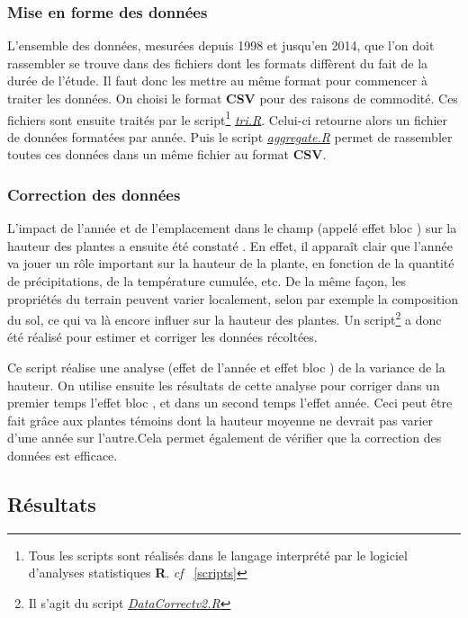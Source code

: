 \documentclass[12pt,a4paper]{article}
\begin{document}
			 			\subsubsection{Mise en forme des données}
			 				
			 				L'ensemble des données, mesurées depuis 1998 et jusqu'en 2014, que l'on doit rassembler se trouve dans des fichiers dont les formats diffèrent du fait de la durée de l'étude. Il faut donc les mettre au même format pour commencer à traiter les données. On choisi le format \textbf{CSV} pour des raisons de commodité. Ces fichiers sont ensuite traités par le script\footnote{Tous les scripts sont réalisés dans le langage interprété par le logiciel d'analyses statistiques \textbf{R}. \textit{cf} ~\ref{scripts}} \textit{\ul{tri.R}}. Celui-ci retourne alors un fichier de données formatées par année. Puis le script \textit{\ul{aggregate.R}} permet de rassembler toutes ces données dans un même fichier au format \textbf{CSV}.
			 			
			 			\subsubsection{Correction des données}
			 				
			 				L'impact de l'année et de l'emplacement dans le champ (appelé \og effet bloc \fg) sur la hauteur des plantes a ensuite été constaté . En effet, il apparaît clair que l'année va jouer un rôle important sur la hauteur de la plante, en fonction de la quantité de précipitations, de la température cumulée, etc. De la même façon, les propriétés du terrain peuvent varier localement, selon par exemple la composition du sol, ce qui va là encore influer sur la hauteur des plantes. Un script\footnote{Il s'agit du script \textit{\ul{DataCorrectv2.R}}} a donc été réalisé pour estimer et corriger les données récoltées.
			 				
			 				Ce script réalise une analyse (effet de l'année et \og effet bloc \fg) de la variance de la hauteur. On utilise ensuite les résultats de cette analyse pour corriger dans un premier temps l'\og effet bloc \fg, et dans un second temps l'effet année. Ceci peut être fait grâce aux plantes témoins dont la hauteur moyenne ne devrait pas varier d'une année sur l'autre.Cela permet également de vérifier que la correction des données est efficace.
			 				
			 		\subsection{Résultats}
			 			
\end{document}
